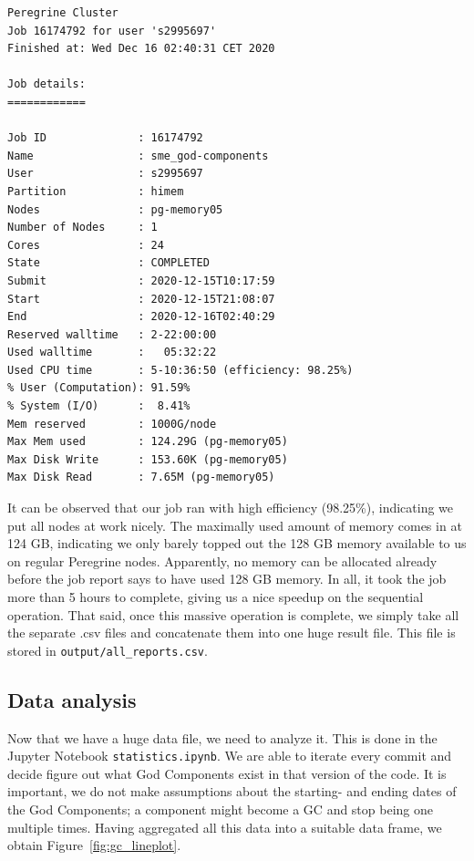 \documentclass{article}
\begin{document}
\begin{lstlisting}[caption={Peregrine job output.}, label={code:peregrine-output}]
Peregrine Cluster
Job 16174792 for user 's2995697'
Finished at: Wed Dec 16 02:40:31 CET 2020

Job details:
============

Job ID              : 16174792
Name                : sme_god-components
User                : s2995697
Partition           : himem
Nodes               : pg-memory05
Number of Nodes     : 1
Cores               : 24
State               : COMPLETED
Submit              : 2020-12-15T10:17:59
Start               : 2020-12-15T21:08:07
End                 : 2020-12-16T02:40:29
Reserved walltime   : 2-22:00:00
Used walltime       :   05:32:22
Used CPU time       : 5-10:36:50 (efficiency: 98.25%)
% User (Computation): 91.59%
% System (I/O)      :  8.41%
Mem reserved        : 1000G/node
Max Mem used        : 124.29G (pg-memory05)
Max Disk Write      : 153.60K (pg-memory05)
Max Disk Read       : 7.65M (pg-memory05)
\end{lstlisting}

It can be observed that our job ran with high efficiency (98.25\%), indicating we put all nodes at work nicely. The maximally used amount of memory comes in at 124 GB, indicating we only barely topped out the 128 GB memory available to us on regular Peregrine nodes. Apparently, no memory can be allocated already before the job report says to have used 128 GB memory. In all, it took the job more than 5 hours to complete, giving us a nice speedup on the sequential operation. That said, once this massive operation is complete, we simply take all the separate .csv files and concatenate them into one huge result file. This file is stored in \texttt{output/all\_reports.csv}.

\subsection{Data analysis}
Now that we have a huge data file, we need to analyze it. This is done in the Jupyter Notebook \texttt{statistics.ipynb}. We are able to iterate every commit and decide figure out what God Components exist in that version of the code. It is important, we do not make assumptions about the starting- and ending dates of the God Components; a component might become a GC and stop being one multiple times. Having aggregated all this data into a suitable data frame, we obtain Figure~\ref{fig:gc_lineplot}.
\end{document}
